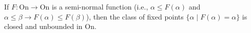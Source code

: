 If $F: \mathrm{On} \rightarrow \mathrm{On}$ is a semi-normal function (i.e., $\alpha \leq F(\alpha)$ and $\alpha \leq \beta \rightarrow F(\alpha) \leq F(\beta)$), then the class of fixed points $\{\alpha \mid F(\alpha) = \alpha\}$ is closed and unbounded in $\mathrm{On}$.
